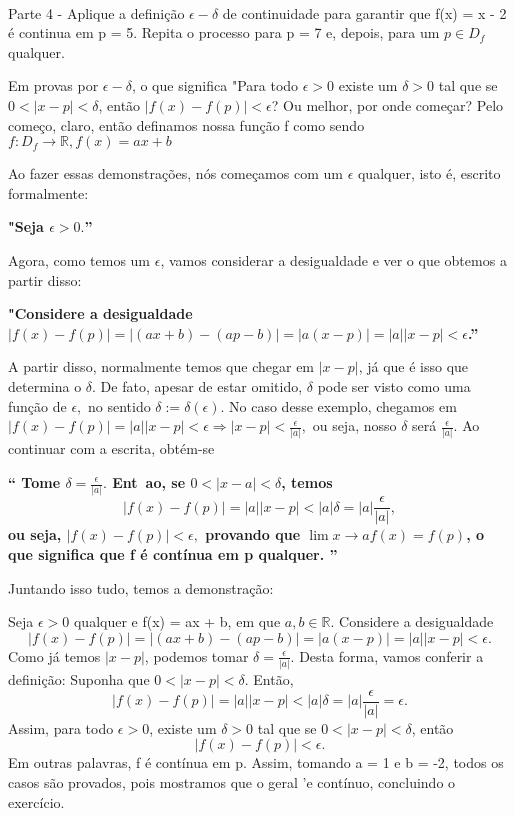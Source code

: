 \paragraph{} Parte 4 - Aplique a defini\c c\~ao $\epsilon-\delta$ de continuidade para garantir que f(x) = x - 2 \'e continua em p = 5. Repita o processo para p = 7 e, depois, para um $p\in{D_f}$ qualquer.
\begin{proof*}
Em provas por $\epsilon-\delta$, o que significa "Para todo $\epsilon > 0$ existe um $\delta > 0$ tal que se $0 < |x - p| < \delta$, ent\~ao $|f(x) - f(p)| < \epsilon$? Ou melhor, por onde come\c car? Pelo come\c co, claro, ent\~ao definamos nossa fun\c c\~ao f como sendo $f:D_f\rightarrow\mathbb{R}, f(x) = ax + b$

Ao fazer essas demonstra\c c\~oes, n\'os come\c camos com um $\epsilon$ qualquer, isto \'e, escrito formalmente:

\textbf{"Seja $\epsilon > 0.$''}

Agora, como temos um $\epsilon$, vamos considerar a desigualdade e ver o que obtemos a partir disso:

\textbf{"Considere a desigualdade $|f(x) - f(p)| = |(ax + b) - (ap - b)| = |a(x - p)| = |a||x - p|< \epsilon$.'' }

A partir disso, normalmente temos que chegar em $|x - p|$, j\'a que \'e isso que determina o $\delta.$ De fato, apesar de estar omitido, $\delta$ pode ser visto como uma fun\c c\~ao de $\epsilon,$ no sentido $\delta := \delta(\epsilon).$
No caso desse exemplo, chegamos em $|f(x) - f(p)| = |a||x - p| < \epsilon \Rightarrow |x - p| < \frac{\epsilon}{|a|},$ ou seja, nosso $\delta$ ser\'a $\frac{\epsilon}{|a|}$. Ao continuar com a escrita, obt\'em-se

\textbf{``
Tome $\delta = \frac{\epsilon}{|a|}.$ Ent~ao, se $0 < |x - a| < \delta$, temos
$$
|f(x) - f(p)| = |a||x - p| < |a|\delta = |a|\frac{\epsilon}{|a|},
$$
ou seja, $|f(x) - f(p)| < \epsilon,$ provando que $\lim{x\to{a}} f(x) = f(p)$, o que significa que f \'e cont\'inua em p qualquer.
''}

Juntando isso tudo, temos a demonstra\c c\~ao:

Seja $\epsilon > 0$ qualquer e f(x) = ax + b, em que $a, b\in\mathbb{R}$. Considere a desigualdade 
$$
|f(x) - f(p)| = |(ax + b) - (ap - b)| = |a(x - p)| = |a||x - p|< \epsilon.
$$
Como j\'a temos $|x - p|$, podemos tomar $\delta = \frac{\epsilon}{|a|}.$ Desta forma, vamos conferir a defini\c c\~ao: Suponha que $0 < |x - p| < \delta.$ Ent\~ao, 
$$
|f(x) - f(p)| = |a||x - p| < |a|\delta = |a|\frac{\epsilon}{|a|} = \epsilon.
$$
Assim, para todo $\epsilon > 0$, existe um $\delta > 0$ tal que se $0 < |x - p| < \delta$, ent\~ao
$$
|f(x) - f(p)| < \epsilon.
$$
Em outras palavras, f \'e cont\'inua em p. Assim, tomando a = 1 e b = -2, todos os casos s\~ao provados, pois mostramos que o geral 'e cont\'inuo, concluindo o exerc\'icio.
\qedsymbol
\end{proof*}

